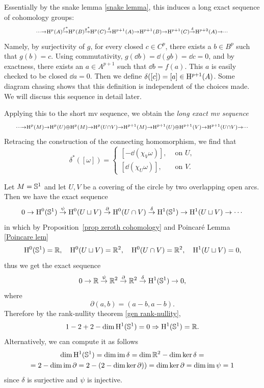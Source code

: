 Essentially by the snake lemma \ref{snake lemma}, this induces a long exact sequence of cohomology groups:
\[
\scriptstyle
\cdots\to \mathrm{H}^p(A)\overset{f^\ast}\to \mathrm{H}^p(B)\overset{g^\ast}\to \mathrm{H}^p(C)\overset\delta\to \mathrm{H}^{p+1}(A)\to \mathrm{H}^{p+1}(B)\to \mathrm{H}^{p+1}(C)\overset\delta\to \mathrm{H}^{p+2}(A)\to \cdots
\]
Namely, by surjectivity of $g$, for every closed $c\in C^p$, there exists a $b\in B^p$ such that $g(b)=c$. Using commutativity,  $g(\dd b)=\dd (gb)=\dd c=0$, and by exactness, there exists an $a\in A^{p+1}$ such that $\dd b=f(a)$. This $a$ is easily checked to be closed $\dd a=0$. Then we define $\delta([c])=[a]\in \mathrm{H}^{p+1}(A)$. Some diagram chasing shows that this definition is independent of the choices made. We will discuss this sequence in detail later.

Applying this to the short \gls{mv} sequence, we obtain the \emph{long exact \gls{mv} sequence}
\[
\scriptstyle
\cdots\to \mathrm{H}^p(M)\to \mathrm{H}^p(U)\oplus \mathrm{H}^p(M)\to \mathrm{H}^p(U\cap V)\to \mathrm{H}^{p+1}(M)\to \mathrm{H}^{p+1}(U)\oplus \mathrm{H}^{p+1}(V)\to \mathrm{H}^{p+1}(U\cap V)\to \cdots
\]
Retracing the construction of the connecting homomorphism, we find that 
\[\delta^\ast([\omega])=
    \begin{cases}
        [-\dd (\chi_V \omega)],& \text{ on }U,\\
        [\dd (\chi_U \omega)],& \text{ on }V.
    \end{cases}
\]

\begin{example}\label{de Rham of circle}
    Let $M=\mathbb{S}^1$ and let $U,V$ be a covering of the circle by two overlapping open arcs. Then we have the exact sequence
    \[0\to \mathrm{H}^0(\mathbb{S}^1)\overset\psi\to \mathrm{H}^0(U\sqcup V)\overset\partial\to \mathrm{H}^0(U\cap V)\overset\delta\to \mathrm{H}^1(\mathbb{S}^1)\to \mathrm{H}^1(U\sqcup V)\to \cdots \]
    in which by Proposition~\ref{prop zeroth cohomology} and Poincar\'e Lemma \ref{Poincare lem}
    \[\mathrm{H}^0(\mathbb{S}^1)=\mathbb{R},\quad \mathrm{H}^0(U\sqcup V)=\mathbb{R}^2,\quad \mathrm{H}^0(U\cap V)=\mathbb{R}^2,\quad \mathrm{H}^1(U\sqcup V)=0,\]
    thus we get the exact sequence
    \[0\to \mathbb{R}\overset\psi\to \mathbb{R}^2\overset{\partial}\to \mathbb{R}^2\overset\delta\to \mathrm{H}^1(\mathbb{S}^1)\to 0,\]
    where
    \[\partial(a,b)=(a-b,a-b).\]
    Therefore by the rank-nullity theorem \ref{gen rank-nullity},
    \[1-2+2-\dim \mathrm{H}^1(\mathbb{S}^1)=0\Rightarrow \mathrm{H}^1(\mathbb{S}^1)=\mathbb{R}.\]
    Alternatively, we can compute it as follows
    \begin{multline}
        \dim \mathrm{H}^1(\mathbb{S}^1)=\dim \operatorname{im} \delta=\dim \mathbb{R}^2-\dim\ker\delta=\\=2-\dim\operatorname{im} \partial=2-(2-\dim\ker\partial))=\dim\ker\partial=\dim\operatorname{im}\psi =1
    \end{multline}
    since $\delta$ is surjective and $\psi$ is injective.
\end{example}


